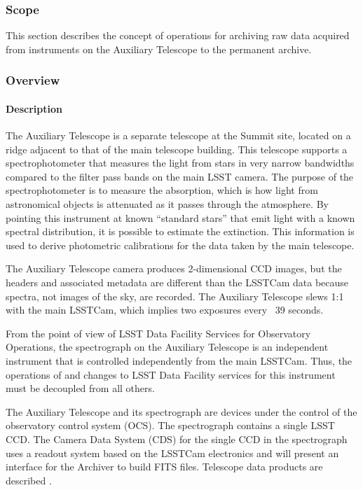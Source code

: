 ﻿\subsubsection{Scope}

This section describes the concept of operations for archiving raw data acquired 
from instruments on the Auxiliary Telescope to the permanent archive.

\subsubsection{Overview}

\paragraph{Description}

The Auxiliary Telescope is a separate telescope at the Summit site, located on a 
ridge adjacent to that of the main telescope building. This telescope supports a 
spectrophotometer that measures the light from stars in very narrow bandwidths 
compared to the filter pass bands on the main LSST camera. The purpose of the 
spectrophotometer is to measure the absorption, which is how light from astronomical 
objects is attenuated as it passes through the atmosphere. By pointing this instrument 
at known “standard stars” that emit light with a known spectral distribution, it is 
possible to estimate the extinction. This information is used to derive photometric 
calibrations for the data taken by the main telescope. 

The Auxiliary Telescope camera produces 2-dimensional CCD images, but the headers 
and associated metadata are different than the LSSTCam data because spectra, not 
images of the sky, are recorded. The Auxiliary Telescope slews 1:1 with the main LSSTCam, 
which implies two exposures every ~39 seconds.

From the point of view of LSST Data Facility Services for Observatory Operations, the 
spectrograph on the Auxiliary Telescope is an independent instrument that is controlled 
independently from the main LSSTCam. Thus, the operations of and changes to LSST 
Data Facility services for this instrument must be decoupled from all others.

The Auxiliary Telescope and its spectrograph are devices under the
control of the observatory control system (OCS). The spectrograph
contains a single LSST CCD. The Camera Data System (CDS) for the single CCD in the 
spectrograph uses a readout system based on the LSSTCam electronics and will
present an interface for the Archiver to build FITS files. Telescope data products 
are described .

